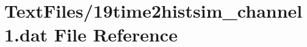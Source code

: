 \hypertarget{19time2histsim__channel1_8dat}{}\section{Text\+Files/19time2histsim\+\_\+channel1.dat File Reference}
\label{19time2histsim__channel1_8dat}
